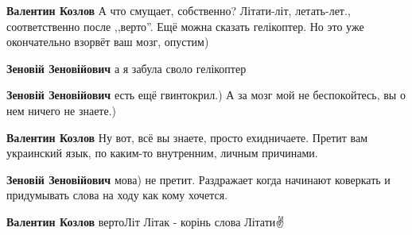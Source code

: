 \begin{itemize}
\begin{itemize}
\textbf{Валентин Козлов} А что смущает, собственно?
Літати-літ, летать-лет., соответственно после ,,верто''. Ещё можна сказать
гелікоптер. Но это уже окончательно взорвёт ваш мозг, опустим)

\begin{itemize}
 
\textbf{Зеновій Зеновійович} а я забула своло гелікоптер\Laughey[1.0][white]

 
\textbf{Зеновій Зеновійович} есть ещё гвинтокрил.) А за мозг мой не беспокойтесь, вы о нем ничего не знаете.)

 
\textbf{Валентин Козлов} Ну вот, всё вы знаете, просто ехидничаете. Претит вам украинский язык, по каким-то внутренним, личным причинами.

 
\textbf{Зеновій Зеновійович} мова) не претит. Раздражает когда начинают коверкать и придумывать слова на ходу как кому хочется.

 
\textbf{Валентин Козлов} вертоЛіт Літак - корінь слова Літати✌
\end{itemize}

\end{itemize}


\end{itemize}
